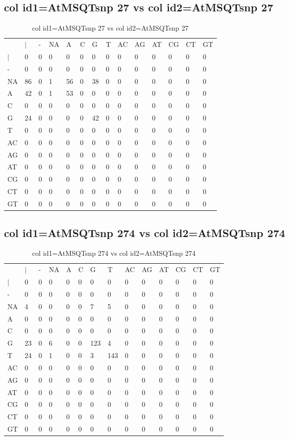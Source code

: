 \subsection{col id1=AtMSQTsnp 27 vs col id2=AtMSQTsnp 27}
\begin{center}
\begin{longtable}{|l|l|l|l|l|l|l|l|l|l|l|l|l|l|}
\caption{col id1=AtMSQTsnp 27 vs col id2=AtMSQTsnp 27} \label{table_dm814}\\
\hline
\\
\hline
&$|$&-&NA&A&C&G&T&AC&AG&AT&CG&CT&GT\\
$|$&0&0&0&0&0&0&0&0&0&0&0&0&0\\
-&0&0&0&0&0&0&0&0&0&0&0&0&0\\
NA&86&0&1&56&0&38&0&0&0&0&0&0&0\\
A&42&0&1&53&0&0&0&0&0&0&0&0&0\\
C&0&0&0&0&0&0&0&0&0&0&0&0&0\\
G&24&0&0&0&0&42&0&0&0&0&0&0&0\\
T&0&0&0&0&0&0&0&0&0&0&0&0&0\\
AC&0&0&0&0&0&0&0&0&0&0&0&0&0\\
AG&0&0&0&0&0&0&0&0&0&0&0&0&0\\
AT&0&0&0&0&0&0&0&0&0&0&0&0&0\\
CG&0&0&0&0&0&0&0&0&0&0&0&0&0\\
CT&0&0&0&0&0&0&0&0&0&0&0&0&0\\
GT&0&0&0&0&0&0&0&0&0&0&0&0&0\\
\hline
\end{longtable}
\end{center}

\subsection{col id1=AtMSQTsnp 274 vs col id2=AtMSQTsnp 274}
\begin{center}
\begin{longtable}{|l|l|l|l|l|l|l|l|l|l|l|l|l|l|}
\caption{col id1=AtMSQTsnp 274 vs col id2=AtMSQTsnp 274} \label{table_dm816}\\
\hline
\\
\hline
&$|$&-&NA&A&C&G&T&AC&AG&AT&CG&CT&GT\\
$|$&0&0&0&0&0&0&0&0&0&0&0&0&0\\
-&0&0&0&0&0&0&0&0&0&0&0&0&0\\
NA&4&0&0&0&0&7&5&0&0&0&0&0&0\\
A&0&0&0&0&0&0&0&0&0&0&0&0&0\\
C&0&0&0&0&0&0&0&0&0&0&0&0&0\\
G&23&0&6&0&0&123&4&0&0&0&0&0&0\\
T&24&0&1&0&0&3&143&0&0&0&0&0&0\\
AC&0&0&0&0&0&0&0&0&0&0&0&0&0\\
AG&0&0&0&0&0&0&0&0&0&0&0&0&0\\
AT&0&0&0&0&0&0&0&0&0&0&0&0&0\\
CG&0&0&0&0&0&0&0&0&0&0&0&0&0\\
CT&0&0&0&0&0&0&0&0&0&0&0&0&0\\
GT&0&0&0&0&0&0&0&0&0&0&0&0&0\\
\hline
\end{longtable}
\end{center}

